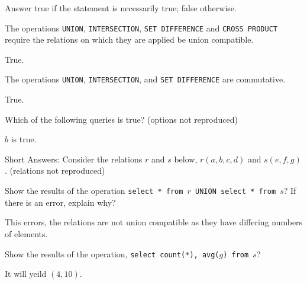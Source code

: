 \documentclass[11pt]{article}
\begin{document}
\begin{question}
    Answer true if the statement is necessarily true; false otherwise.

    \begin{subquestion}
        The operations {\tt UNION}, {\tt INTERSECTION}, {\tt SET DIFFERENCE} and {\tt CROSS PRODUCT} require the relations on which they are applied be union compatible.

        True.
    \end{subquestion}

    \begin{subquestion}
        The operations {\tt UNION}, {\tt INTERSECTION}, and {\tt SET DIFFERENCE} are commutative.

        True.
    \end{subquestion}

    \begin{subquestion}
        Which of the following queries is true? (options not reproduced)

        $b$ is true.
    \end{subquestion}
\end{question}
\begin{question}
    Short Answers: Consider the relations $r$ and $s$ below, $r(a, b, c, d)$ and $s(e, f, g)$. (relations not reproduced)

    \begin{subquestion}
        Show the results of the operation {\tt select * from $r$ UNION select * from $s$}? If there is an error, explain why?

        This errors, the relations are not union compatible as they have differing numbers of elements.
    \end{subquestion}

    \begin{subquestion}
        Show the results of the operation, {\tt select count(*), avg($g$) from $s$}?

        It will yeild $(4, 10)$.
    \end{subquestion}

\end{question}
\end{document}
